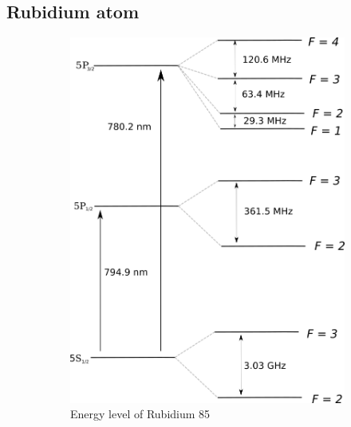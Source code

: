 \documentclass[a4paper,10pt]{article}
\begin{document}
\subsection{Rubidium atom}
\begin{figure}[H]
    \centering
    \begin{subfigure}[b]{0.49\textwidth}
        \includegraphics[width=\textwidth]{rubidium85}
        \caption{Energy level of Rubidium 85}
    \end{subfigure}
    \hfill
    \begin{subfigure}[b]{0.49\textwidth}

\end{subfigure}
\end{figure}
\end{document}
